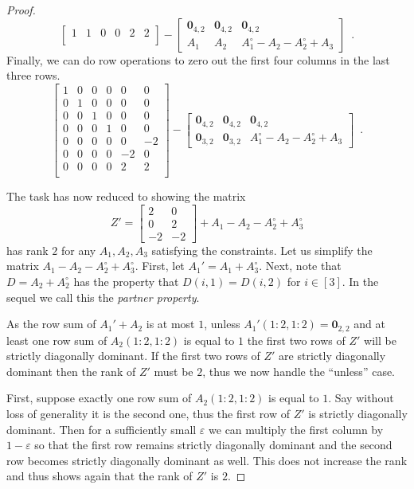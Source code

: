 \documentclass[10pt,a4paper]{article}
\newcommand{\zero}{\mathbf{0}}
\newcommand{\1}{\mathbf{1}}
\theoremstyle{definition}
\begin{document}
\begin{proof}
\[\begin{bmatrix}
1 &  1 &  0 &  0 &  2 &  2 \\
\end{bmatrix}
-
\begin{bmatrix}
\zero_{4,2} & \zero_{4,2} & \zero_{4,2} \\
A_1 & A_2 & A_1^\circ -A_2 - A_2^\circ + A_3
\end{bmatrix}
\enspace .
\]
Finally, we can do row operations to zero out the first four columns in the last three rows.
\[
\begin{bmatrix}
1 &  0 &  0 &  0 &  0 & 0 \\
0 &  1 &  0 &  0 & 0 &  0 \\
0 &  0 &  1 &  0 &  0 &  0 \\
0 &  0 &  0 &  1 &  0 &  0 \\
0 &  0 &  0 &  0 &  0 &  -2 \\
0 &  0 &  0 &  0 &  -2 &  0 \\
0 &  0 &  0 &  0 &  2 &  2 \\
\end{bmatrix}
-
\begin{bmatrix}
\zero_{4,2} & \zero_{4,2} & \zero_{4,2} \\
\zero_{3,2} & \zero_{3,2} & A_1^\circ -A_2 - A_2^\circ + A_3
\end{bmatrix}
\enspace .
\]

The task has now reduced to showing the matrix
\[
Z'=
\begin{bmatrix}
2 & 0 \\
0 & 2 \\
-2 & -2
\end{bmatrix}
+ A_1 - A_2 - A_2^\circ + A_3^\circ
\]
has rank $2$ for any $A_1, A_2, A_3$ satisfying the constraints.  Let us simplify the matrix $A_1 - A_2 - A_2^\circ + A_3^\circ$.
First, let $A_1' = A_1 + A_3^\circ$.  Next, note that $D = A_2 + A_2^\circ$ has the property that $D(i,1) = D(i,2)$ for $i \in [3]$.
In the sequel we call this the \emph{partner property}.

As the row sum of $A_1' + A_2$ is at most $1$, unless $A_1'(1:2,1:2) = \zero_{2,2}$ and at least one row sum of $A_2(1:2,1:2)$ is equal to $1$ the
first two rows of $Z'$ will be strictly diagonally dominant.  If the first two rows of $Z'$ are strictly diagonally dominant then the
rank of $Z'$ must be $2$, thus we now handle the ``unless'' case.

First, suppose exactly one row sum of $A_2(1:2,1:2)$ is equal to $1$. Say without loss of generality it is the second one, thus
the first row of $Z'$ is strictly diagonally dominant.  Then for a sufficiently small $\varepsilon$ we can multiply the first column by $1-\varepsilon$
so that the first row remains strictly diagonally dominant and the second row becomes strictly diagonally dominant as well.  This
does not increase the rank and thus shows again that the rank of $Z'$ is $2$.


\end{proof}
\end{document}
